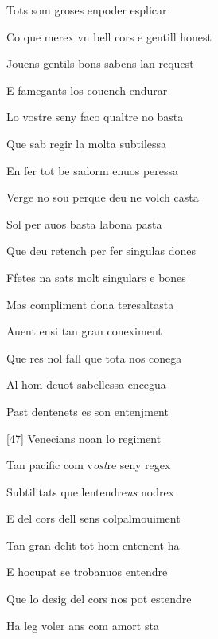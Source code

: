 \documentclass[12pt]{article}
\begin{document}
\begin{estrofa}

 Tots som groses enpoder esplicar

 Co que merex vn bell cors e \sout{gentill} honest

 Jouens gentils bons sabens lan request

 E famegants los couench endurar

 Lo vostre seny faco qualtre no basta

 Que sab regir la molta subtilessa

 En fer tot be sadorm enuos peressa

 Verge no sou perque deu ne volch casta

\end{estrofa}



\begin{estrofa}

 Sol per auos basta labona pasta

 Que deu retench per fer singulas dones

 Ffetes na sats molt singulars e bones

 Mas compliment dona teresaltasta

 Auent ensi tan gran coneximent

 Que res nol fall que tota nos conega

 Al hom deuot sabellessa encegua

 Past dentenets es son entenjment

\end{estrofa}



\begin{estrofa}

 [47] Venecians noan lo regiment

 Tan pacific com v\textit{ost}re seny regex

 Subtilitats que lentendre\textit{us} nodrex

 E del cors dell sens colpalmouiment

 Tan gran delit tot hom entenent ha

 E hocupat se trobanuos entendre

 Que lo desig del cors nos pot estendre

 Ha leg voler ans com amort sta

\end{estrofa}
\end{document}
